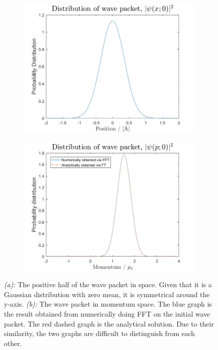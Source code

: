 \begin{figure}[H]
    \centering
    \captionsetup[subfigure]{justification=centering}
    \begin{subfigure}[b]{0.8\textwidth}
        \centering
        \includegraphics[width=\textwidth]{graphics/task1/position_prob.png}
		\caption{}
		\label{fig:1_a}
    \end{subfigure}
    \begin{subfigure}[b]{0.8\textwidth}
        \centering
        \includegraphics[width=\textwidth]{graphics/task1/momentum_prob.png}
        \caption{}
		\label{fig:1_b}
    \end{subfigure}
    \caption{\textit{(a):} The positive half of the wave packet in space. Given that it is a Gaussian distribution with zero mean, it is symmetrical around the y-axis. \textit{(b):} The wave packet in momentum space. The blue graph is the result obtained from numerically doing FFT on the initial wave packet. The red dashed graph is the analytical solution. Due to their similarity, the two graphs are difficult to distinguish from each other.}
    \label{fig:1}
\end{figure}


